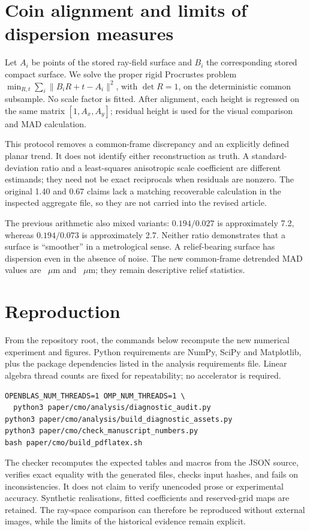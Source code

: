 \documentclass[10pt,a4paper]{article}
\begin{document}
\section{Coin alignment and limits of dispersion measures}
Let $A_i$ be points of the stored ray-field surface and $B_i$ the corresponding stored compact surface. We solve the proper rigid Procrustes problem $\min_{R,t}\sum_i\|B_iR+t-A_i\|^2$, with $\det R=1$, on the deterministic common subsample. No scale factor is fitted. After alignment, each height is regressed on the same matrix $[1,A_x,A_y]$; residual height is used for the visual comparison and MAD calculation.

This protocol removes a common-frame discrepancy and an explicitly defined planar trend. It does not identify either reconstruction as truth. A standard-deviation ratio and a least-squares anisotropic scale coefficient are different estimands; they need not be exact reciprocals when residuals are nonzero. The original 1.40 and 0.67 claims lack a matching recoverable calculation in the inspected aggregate file, so they are not carried into the revised article.

The previous arithmetic also mixed variants: $0.194/0.027$ is approximately 7.2, whereas $0.194/0.073$ is approximately 2.7. Neither ratio demonstrates that a surface is ``smoother'' in a metrological sense. A relief-bearing surface has dispersion even in the absence of noise. The new common-frame detrended MAD values are \CoinRayMAD~$\mu$m and \CoinCompactMAD~$\mu$m; they remain descriptive relief statistics.

\section{Reproduction}
From the repository root, the commands below recompute the new numerical experiment and figures. Python requirements are NumPy, SciPy and Matplotlib, plus the package dependencies listed in the analysis requirements file. Linear algebra thread counts are fixed for repeatability; no accelerator is required.
\begin{verbatim}
OPENBLAS_NUM_THREADS=1 OMP_NUM_THREADS=1 \
  python3 paper/cmo/analysis/diagnostic_audit.py
python3 paper/cmo/analysis/build_diagnostic_assets.py
python3 paper/cmo/check_manuscript_numbers.py
bash paper/cmo/build_pdflatex.sh
\end{verbatim}
The checker recomputes the expected tables and macros from the JSON source, verifies exact equality with the generated files, checks input hashes, and fails on inconsistencies. It does not claim to verify unencoded prose or experimental accuracy. Synthetic realisations, fitted coefficients and reserved-grid maps are retained. The ray-space comparison can therefore be reproduced without external images, while the limits of the historical evidence remain explicit.
\end{document}
